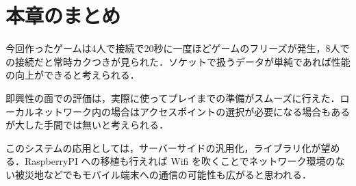 \newpage

\section{本章のまとめ}
今回作ったゲームは4人で接続で20秒に一度ほどゲームのフリーズが発生，8人での接続だと常時カクつきが見られた．ソケットで扱うデータが単純であれば性能の向上ができると考えられる．

即興性の面での評価は，実際に使ってプレイまでの準備がスムーズに行えた．ローカルネットワーク内の場合はアクセスポイントの選択が必要になる場合もあるが大した手間では無いと考えられる．


このシステムの応用としては，サーバーサイドの汎用化，ライブラリ化が望める．RaspberryPI への移植も行えれば Wifi を吹くことでネットワーク環境のない被災地などでもモバイル端末への通信の可能性も広がると思われる．

\newpage
